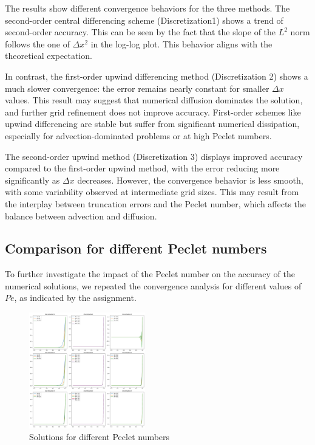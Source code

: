 \documentclass{article}
\begin{document}
The results show different convergence behaviors for the three methods. 
The second-order central differencing scheme (Discretization1) shows a trend of second-order accuracy. This can be seen by the fact that the slope of the $L^2$ norm
follows the one of $\Delta x^2$ in the log-log plot. This behavior aligns with the theoretical expectation.

In contrast, the first-order upwind differencing method (Discretization 2) shows a much slower convergence: the error remains nearly constant for smaller $\Delta x$ values.
This result may suggest that numerical diffusion dominates the solution, and further grid refinement does not improve accuracy.
First-order schemes like upwind differencing are stable but suffer from significant numerical dissipation, especially for advection-dominated problems or at high Peclet numbers.

The second-order upwind method (Discretization 3) displays improved accuracy compared to the first-order upwind method, with the error reducing more significantly as  $\Delta x$ decreases.
However, the convergence behavior is less smooth, with some variability observed at intermediate grid sizes. This may result from the interplay between truncation errors and the Peclet number, which affects the balance between advection and diffusion.

\subsection{Comparison for different Peclet numbers}
To further investigate the impact of the Peclet number on the accuracy of the numerical solutions, we repeated the convergence analysis for different values of $Pe$, as indicated by the assignment.

\begin{figure}[h!]
    \centering
    \includegraphics[width=0.45\textwidth]{task2_fixed_dx.png}
    \caption{Solutions for different Peclet numbers}
    \label{fig:L2norm_fixed_dx}
\end{figure}
\end{document}
